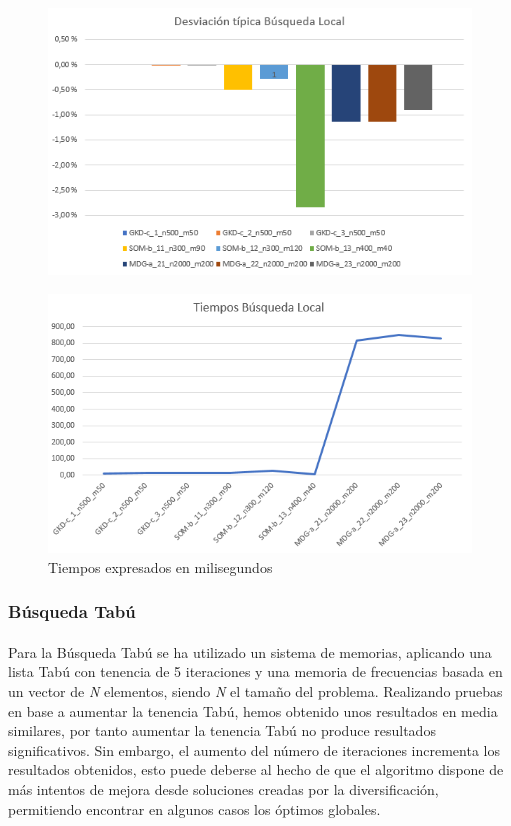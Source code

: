 \documentclass{article}
\begin{document}
		
			\begin{figure}[H]
				
				\centering
				\includegraphics[scale=0.4]{img/DTBlocal}
				
			\end{figure}
		
			\begin{figure}[H]
				
				\centering
				\includegraphics[scale=0.4]{img/TiemposBlocal}
				\caption{Tiempos expresados en milisegundos}
				
			\end{figure}
			
		\subsubsection{Búsqueda Tabú}
	
			\paragraph{}Para la Búsqueda Tabú se ha utilizado un sistema de memorias, aplicando una lista Tabú con tenencia de 5 iteraciones y una memoria de frecuencias basada en un vector de \emph{N} elementos, siendo \emph{N} el tamaño del problema. Realizando pruebas en base a aumentar la tenencia Tabú, hemos obtenido unos resultados en media similares, por tanto aumentar la tenencia Tabú no produce resultados significativos. Sin embargo, el aumento del número de iteraciones incrementa los resultados obtenidos, esto puede deberse al hecho de que el algoritmo dispone de más intentos de mejora desde soluciones creadas por la diversificación, permitiendo encontrar en algunos casos los óptimos globales.
			
\end{document}
